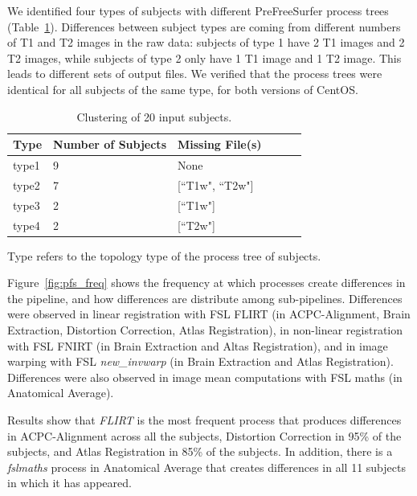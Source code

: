 \documentclass[a4paper,num-refs]{oup-contemporary}
\begin{document}
We identified four types of subjects with different PreFreeSurfer process
trees (Table~\ref{table:data-clusters}). Differences between subject types
are coming from different  numbers of T1 and T2 images in the raw data:
subjects of type 1 have 2 T1 images and 2 T2 images, while subjects of type
2 only have 1 T1 image and 1 T2 image. This leads to
different sets of output files. We verified that the process trees were
identical for all subjects of the same type, for both versions of
CentOS.

\begin{table}
\centering
\begin{threeparttable}
\caption{Clustering of 20 input subjects.}
\label{table:data-clusters}

\begin{tabular}{@{}llllll@{}}
\toprule
Type   & Number of Subjects  & Missing File(s)                                    \\ \midrule
type1  & 9                   & None                                               \\
type2  & 7                   & [``T1w", ``T2w"]                                   \\
type3  & 2                   & [``T1w"]                                           \\
type4  & 2                   & [``T2w"]                                           \\ \bottomrule
\end{tabular}
\begin{tablenotes}
     \small
     \item *Type refers to the topology type of the process tree of subjects.
\end{tablenotes}
\end{threeparttable}
\end{table}

Figure~\ref{fig:pfs_freq} shows the frequency at which  processes create differences 
in the pipeline, and how differences are distribute among sub-pipelines.
Differences were observed in linear registration 
with FSL FLIRT (in ACPC-Alignment, Brain Extraction, Distortion Correction, 
Atlas Registration), in non-linear registration with FSL FNIRT (in Brain Extraction 
and Altas Registration), and in image warping with FSL \emph{new\_invwarp} (in Brain Extraction 
and Atlas Registration). 
Differences were also observed in image mean 
computations with FSL maths  (in Anatomical Average). 

Results show that \emph{FLIRT} is the most frequent process that produces 
differences in ACPC-Alignment across all the subjects, Distortion Correction 
in 95\% of the subjects, and Atlas Registration in 85\% of the subjects. 
In addition, there is a \emph{fslmaths} process in Anatomical Average that 
creates differences in all 11 subjects in which it has appeared.
\end{document}
